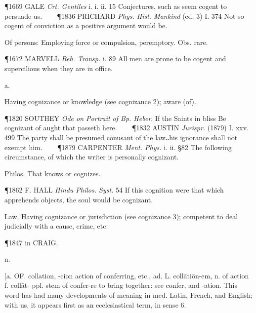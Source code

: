 \begin{description}[wide, labelwidth=!, labelindent=0pt]
\begin{myenumerate}
\P 1669 GALE  \textit{Crt. Gentiles} i. i. ii. 15 Conjectures, such as seem cogent to persuade us.    
\P 1836 PRICHARD  \textit{Phys. Hist. Mankind} (ed. 3) I. 374 Not so cogent of conviction as a positive argument would be.

 Of persons: Employing force or compulsion, peremptory. Obs. rare.

\P 1672 MARVELL  \textit{Reh. Transp.} i. 89 All men are prone to be cogent and supercilious when they are in office.
\end{myenumerate}


 a.

\noindent {}

\vspace{-0.3cm}

\begin{myenumerate}

 Having cognizance or knowledge (see cognizance 2); aware (of).

\P 1820 SOUTHEY  \textit{Ode on Portrait of Bp. Heber}, If the Saints in bliss Be cognizant of aught that passeth here.    
\P 1832 AUSTIN  \textit{Jurispr.} (1879) I. xxv. 499 The party shall be presumed conusant of the law‥his ignorance shall not exempt him.    
\P 1879 CARPENTER  \textit{Ment. Phys.} i. ii. §82 The following circumstance, of which the writer is personally cognizant.

 Philos. That knows or cognizes.

\P 1862 F. HALL  \textit{Hindu Philos. Syst.} 54 If this cognition were that which apprehends objects, the soul would be cognizant.

 Law. Having cognizance or jurisdiction (see cognizance 3); competent to deal judicially with a cause, crime, etc.

\P 1847 in CRAIG.
\end{myenumerate}


 n.

\noindent {}

\noindent [a. OF. collation, -cion action of conferring, etc., ad. L. collātiōn-em, n. of action f. collāt- ppl. stem of confer-re to bring together: see confer, and -ation. This word has had many developments of meaning in med. Latin, French, and English; with us, it appears first as an ecclesiastical term, in sense 6.


\end{description}
